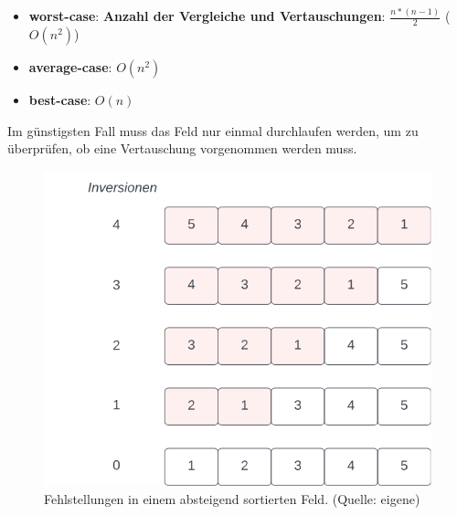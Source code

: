 \begin{itemize}
    \item \textbf{worst-case}: \textbf{Anzahl der Vergleiche und Vertauschungen}: $\frac{n * ( n - 1)}{2}$ ($O(n^2)$)
    \item \textbf{average-case}: $O(n^2)$
    \item \textbf{best-case}: $O(n)$
\end{itemize}


\noindent
Im günstigsten Fall muss das Feld nur einmal durchlaufen werden, um zu überprüfen, ob eine Vertauschung vorgenommen werden muss.\\


\begin{figure}
    \begin{center}
        \includegraphics[scale=0.5]{chapters/Sortierverfahren/img/inversions}
        \caption{Fehlstellungen in einem absteigend sortierten Feld. (Quelle: eigene)}
        \label{fig:inversions}
    \end{center}
\end{figure}